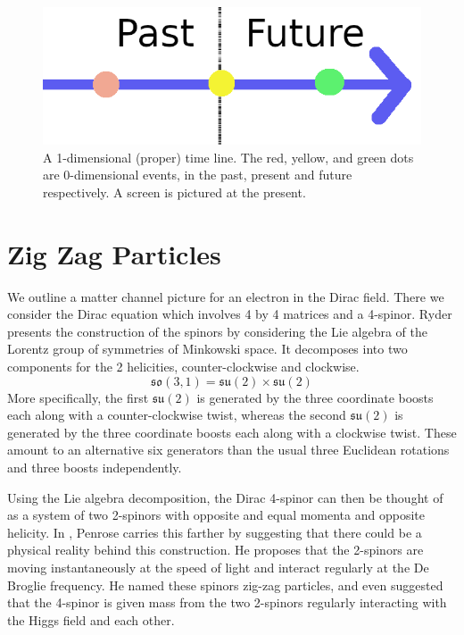 \documentclass[12pt,a4paper]{article}
\begin{document}

\begin{figure}[H]
\centering
\includegraphics[scale=0.23]{time_line.png}
\caption{A 1-dimensional (proper) time line.  The red, yellow, and green dots are 0-dimensional events, in the past, present and future respectively.  A screen is pictured at the present.}
\label{timeline}
\end{figure}

\section{Zig Zag Particles}
\label{ticktock}
We outline a matter channel picture for an electron in the Dirac field.  There we consider the Dirac equation which involves 4 by 4 matrices and a 4-spinor.  Ryder \cite{ryder} presents the construction of the spinors by considering the Lie algebra of the Lorentz group of symmetries of Minkowski space.  It decomposes into two components for the 2 helicities, counter-clockwise and clockwise.
\[
\mathfrak{so(3,1)} = \mathfrak{su(2)} \times \mathfrak{su(2)}
\]
More specifically, the first $\mathfrak{su(2)}$ is generated by the three coordinate boosts each along with a counter-clockwise twist, whereas the second $\mathfrak{su(2)}$ is generated by the three coordinate boosts each along with a clockwise twist.  These amount to an alternative six generators than the usual three Euclidean rotations and three boosts independently.

Using the Lie algebra decomposition, the Dirac 4-spinor can then be thought of as a system of two 2-spinors with opposite and equal momenta and opposite helicity.  In \cite{penrose}, Penrose carries this farther by suggesting that there could be a physical reality behind this construction.  He proposes that the 2-spinors are moving instantaneously at the speed of light and interact regularly at the De Broglie frequency.  He named these spinors zig-zag particles, and even suggested that the 4-spinor is given mass from the two 2-spinors regularly interacting with the Higgs field and each other.
\end{document}
